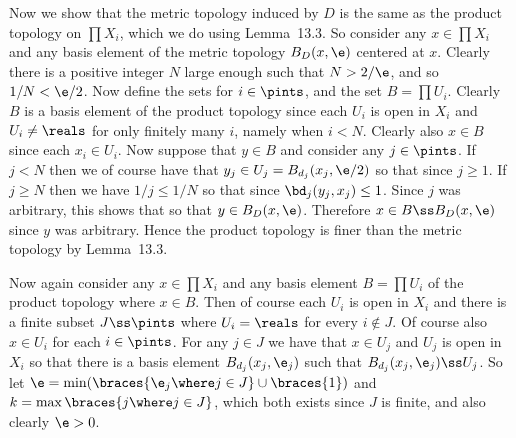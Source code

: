 {{    Now we show that the metric topology induced by $D$ is the same as the product topology on $\prod X_i$, which we do using Lemma~13.3.
    So consider any $x \in \prod X_i$ and any basis element of the metric topology $B_D(x,\e)$ centered at $x$.
    Clearly there is a positive integer $N$ large enough such that $N > 2/\e$, and so $1/N < \e/2$.
    Now define the sets
    for $i \in \pints$, and the set $B = \prod U_i$.
    Clearly $B$ is a basis element of the product topology since each $U_i$ is open in $X_i$ and $U_i \neq \reals$ for only finitely many $i$, namely when $i < N$.
    Clearly also $x \in B$ since each $x_i \in U_i$.
    Now suppose that $y \in B$ and consider any $j \in \pints$.
    If $j < N$ then we of course have that $y_j \in U_j = B_{d_j}(x_j, \e/2)$ so that
    since $j \geq 1$.
    If $j \geq N$ then we have $1/j \leq 1/N$ so that
    since $\bd_j(y_j,x_j) \leq 1$.
    Since $j$ was arbitrary, this shows that
    so that $y \in B_D(x,\e)$.
    Therefore $x \in B \ss B_D(x,\e)$ since $y$ was arbitrary.
    Hence the product topology is finer than the metric topology by Lemma~13.3.

    Now again consider any $x \in \prod X_i$ and any basis element $B = \prod U_i$ of the product topology where $x \in B$.
    Then of course each $U_i$ is open in $X_i$ and there is a finite subset $J \ss \pints$ where $U_i = \reals$ for every $i \notin J$.
    Of course also $x \in U_i$ for each $i \in \pints$.
    For any $j \in J$ we have that $x \in U_j$ and $U_j$ is open in $X_i$ so that there is a basis element $B_{d_j}(x_j, \e_j)$ such that $B_{d_j}(x_j, \e_j) \ss U_j$.
    So let $\e = \min(\braces{\e_j \where j \in J} \cup \braces{1})$ and $k = \max\braces{j \where j \in J}$, which both exists since $J$ is finite, and also clearly $\e > 0$.

}}
